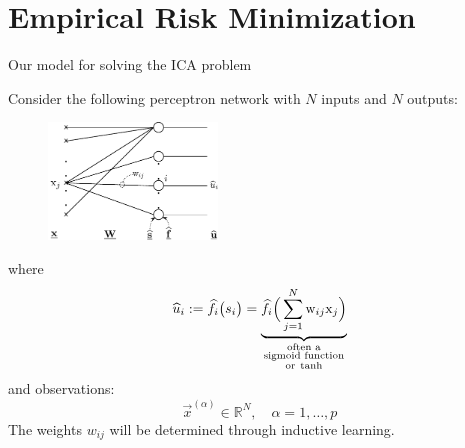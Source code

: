 \section{Empirical Risk Minimization}


\begin{frame}{Our model for solving the ICA problem}

Consider the following perceptron network with $N$ inputs and $N$ outputs:
\begin{figure}[ht]
\centering
\includegraphics[width=4.5cm]{img/section2_fig16}
\end{figure}
where
\svspace{-4mm}
\begin{equation}
\widehat{u}_i := \widehat{f}_i 
	\big( 
		s_i 
	\big) = \underbrace{
	\widehat{f}_i 
	\Big( \sum_{j=1}^{N} \mathrm{w}_{ij} 
		\mathrm{x}_j 
	\Big) }_{
	\substack{
		\text{often a} \\
		\text{sigmoid function}\\
		\text{or\;} \tanh}
	}
\end{equation}
and observations:
\svspace{-4mm}
\begin{equation}
\vec{x}^{(\alpha)} \in \mathbb{R}^N, 
		\quad \alpha = 1, \ldots, p
\end{equation}
The weights $w_{ij}$ will be determined through inductive learning.

\end{frame}

